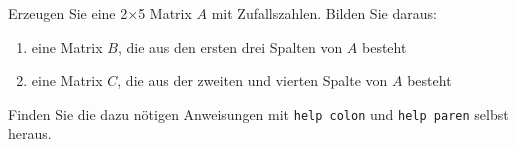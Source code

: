     \secMexercise
    \begin{frame}
        \frameMexercise
        \begin{exercise}
            \sloppy
            Erzeugen Sie eine 2$\times$5 Matrix $A$ mit Zufallszahlen. Bilden Sie daraus:\\
            \begin{enumerate}
                \item eine Matrix $B$, die aus den ersten drei Spalten von $A$ besteht
                \item eine Matrix $C$, die aus der zweiten und vierten Spalte von $A$ besteht
            \end{enumerate}

            \vspace{0.5cm}

            Finden Sie die dazu nötigen Anweisungen mit \texttt{help colon} und \texttt{help paren} selbst heraus.
        \end{exercise}
    \end{frame}


